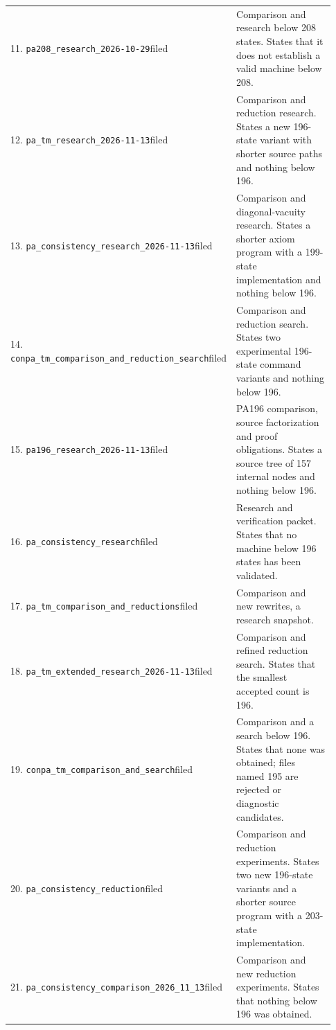 {\begin{longtable}{@{}p{0.34\linewidth}p{0.59\linewidth}@{}}
11. \nolinkurl{pa208_research_2026-10-29}\newline filed&Comparison and research below 208 states. States that it does not establish a valid machine below 208.\\[4pt]
12. \nolinkurl{pa_tm_research_2026-11-13}\newline filed&Comparison and reduction research. States a new 196-state variant with shorter source paths and nothing below 196.\\[4pt]
13. \nolinkurl{pa_consistency_research_2026-11-13}\newline filed&Comparison and diagonal-vacuity research. States a shorter axiom program with a 199-state implementation and nothing below 196.\\[4pt]
14. \nolinkurl{conpa_tm_comparison_and_reduction_search}\newline filed&Comparison and reduction search. States two experimental 196-state command variants and nothing below 196.\\[4pt]
15. \nolinkurl{pa196_research_2026-11-13}\newline filed&PA196 comparison, source factorization and proof obligations. States a source tree of 157 internal nodes and nothing below 196.\\[4pt]
16. \nolinkurl{pa_consistency_research}\newline filed&Research and verification packet. States that no machine below 196 states has been validated.\\[4pt]
17. \nolinkurl{pa_tm_comparison_and_reductions}\newline filed&Comparison and new rewrites, a research snapshot.\\[4pt]
18. \nolinkurl{pa_tm_extended_research_2026-11-13}\newline filed&Comparison and refined reduction search. States that the smallest accepted count is 196.\\[4pt]
19. \nolinkurl{conpa_tm_comparison_and_search}\newline filed&Comparison and a search below 196. States that none was obtained; files named 195 are rejected or diagnostic candidates.\\[4pt]
20. \nolinkurl{pa_consistency_reduction}\newline filed&Comparison and reduction experiments. States two new 196-state variants and a shorter source program with a 203-state implementation.\\[4pt]
21. \nolinkurl{pa_consistency_comparison_2026_11_13}\newline filed&Comparison and new reduction experiments. States that nothing below 196 was obtained.\\[4pt]

\end{longtable}}
